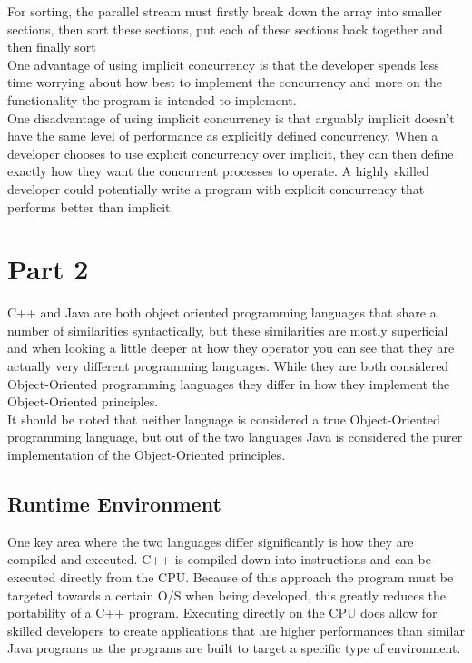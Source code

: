 \documentclass[11pt]{article}  %
\theoremstyle{definition}
\theoremstyle{remark}
\begin{document}
 For sorting, the parallel stream must  firstly break down the array into smaller sections, then sort these sections, put each of these sections back together and then finally sort \\

 One advantage of using implicit concurrency is that the developer spends less time worrying about how best to implement the concurrency and more on the functionality the program is intended to implement.\\

One disadvantage of using implicit concurrency is that arguably implicit doesn't have the same level of performance as explicitly defined concurrency. When a developer chooses to use explicit concurrency over implicit, they can then define exactly how they want the concurrent processes to operate. A highly skilled developer could potentially write a program with explicit concurrency that performs better than implicit.\\



\section{Part 2}\label{s:intro}

C++ and Java are both object oriented programming languages that share a number of similarities syntactically, but these similarities are mostly superficial and when looking a little deeper at how they operator you can see that they are actually very different programming languages. While they are both considered Object-Oriented programming languages they differ in how they implement the Object-Oriented principles.\\

It should be noted that neither language is considered a true Object-Oriented programming language, but out of the two languages Java is considered the purer implementation of the Object-Oriented principles.\\


\subsection{Runtime Environment}\label{ss:back}

One key area where the two languages differ significantly is how they are compiled and executed. C++ is compiled down into instructions and can be executed directly from the CPU. Because of this approach the program must be targeted towards a certain O/S when being developed, this greatly reduces the portability of a C++ program.  Executing directly on the CPU does allow for skilled developers to create applications that are higher performances than similar Java programs as the programs are built to target a specific type of environment.  \\
\end{document}
